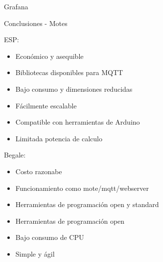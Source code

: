 \documentclass[aspectratio= 43]{beamer}
\begin{document}
\begin{frame}{Grafana}
\end{frame}

\begin{frame}{Conclusiones - Motes}
      \begin{multicols}{2}
      ESP:
      \begin{itemize}
	    \item Económico y asequible
	    \item Bibliotecas disponibles para MQTT
	    \item Bajo consumo y dimensiones reducidas
	    \item Fácilmente escalable
	    \item Compatible con herramientas de Arduino
	    \item Limitada potencia de calculo
	\end{itemize}

	\columnbreak

	Begale:
	\begin{itemize}
	    \item Costo razonabe 
	    \item Funcionamiento como mote/mqtt/webserver
	    \item Herramientas de programación open y standard
	    \item Herramientas de programación open
	    \item Bajo consumo de CPU
	    \item Simple y ágil
	\end{itemize}
      \end{multicols} 
  \end{frame}
\end{document}
